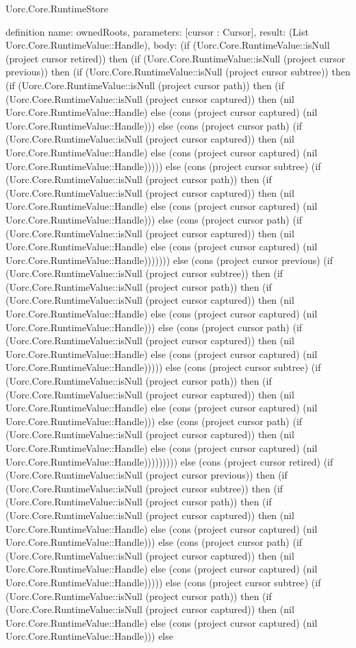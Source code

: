 \begin{lexlean}{Uorc.Core.RuntimeStore}
\begin{semanticmodule}
definition{
  name: ownedRoots,
  parameters: [cursor : Cursor],
  result: (List Uorc.Core.RuntimeValue::Handle),
  body: (if (Uorc.Core.RuntimeValue::isNull (project cursor retired)) then (if (Uorc.Core.RuntimeValue::isNull (project cursor previous)) then (if (Uorc.Core.RuntimeValue::isNull (project cursor subtree)) then (if (Uorc.Core.RuntimeValue::isNull (project cursor path)) then (if (Uorc.Core.RuntimeValue::isNull (project cursor captured)) then (nil Uorc.Core.RuntimeValue::Handle) else (cons (project cursor captured) (nil Uorc.Core.RuntimeValue::Handle))) else (cons (project cursor path) (if (Uorc.Core.RuntimeValue::isNull (project cursor captured)) then (nil Uorc.Core.RuntimeValue::Handle) else (cons (project cursor captured) (nil Uorc.Core.RuntimeValue::Handle))))) else (cons (project cursor subtree) (if (Uorc.Core.RuntimeValue::isNull (project cursor path)) then (if (Uorc.Core.RuntimeValue::isNull (project cursor captured)) then (nil Uorc.Core.RuntimeValue::Handle) else (cons (project cursor captured) (nil Uorc.Core.RuntimeValue::Handle))) else (cons (project cursor path) (if (Uorc.Core.RuntimeValue::isNull (project cursor captured)) then (nil Uorc.Core.RuntimeValue::Handle) else (cons (project cursor captured) (nil Uorc.Core.RuntimeValue::Handle))))))) else (cons (project cursor previous) (if (Uorc.Core.RuntimeValue::isNull (project cursor subtree)) then (if (Uorc.Core.RuntimeValue::isNull (project cursor path)) then (if (Uorc.Core.RuntimeValue::isNull (project cursor captured)) then (nil Uorc.Core.RuntimeValue::Handle) else (cons (project cursor captured) (nil Uorc.Core.RuntimeValue::Handle))) else (cons (project cursor path) (if (Uorc.Core.RuntimeValue::isNull (project cursor captured)) then (nil Uorc.Core.RuntimeValue::Handle) else (cons (project cursor captured) (nil Uorc.Core.RuntimeValue::Handle))))) else (cons (project cursor subtree) (if (Uorc.Core.RuntimeValue::isNull (project cursor path)) then (if (Uorc.Core.RuntimeValue::isNull (project cursor captured)) then (nil Uorc.Core.RuntimeValue::Handle) else (cons (project cursor captured) (nil Uorc.Core.RuntimeValue::Handle))) else (cons (project cursor path) (if (Uorc.Core.RuntimeValue::isNull (project cursor captured)) then (nil Uorc.Core.RuntimeValue::Handle) else (cons (project cursor captured) (nil Uorc.Core.RuntimeValue::Handle))))))))) else (cons (project cursor retired) (if (Uorc.Core.RuntimeValue::isNull (project cursor previous)) then (if (Uorc.Core.RuntimeValue::isNull (project cursor subtree)) then (if (Uorc.Core.RuntimeValue::isNull (project cursor path)) then (if (Uorc.Core.RuntimeValue::isNull (project cursor captured)) then (nil Uorc.Core.RuntimeValue::Handle) else (cons (project cursor captured) (nil Uorc.Core.RuntimeValue::Handle))) else (cons (project cursor path) (if (Uorc.Core.RuntimeValue::isNull (project cursor captured)) then (nil Uorc.Core.RuntimeValue::Handle) else (cons (project cursor captured) (nil Uorc.Core.RuntimeValue::Handle))))) else (cons (project cursor subtree) (if (Uorc.Core.RuntimeValue::isNull (project cursor path)) then (if (Uorc.Core.RuntimeValue::isNull (project cursor captured)) then (nil Uorc.Core.RuntimeValue::Handle) else (cons (project cursor captured) (nil Uorc.Core.RuntimeValue::Handle))) else }
\end{semanticmodule}
\end{lexlean}

